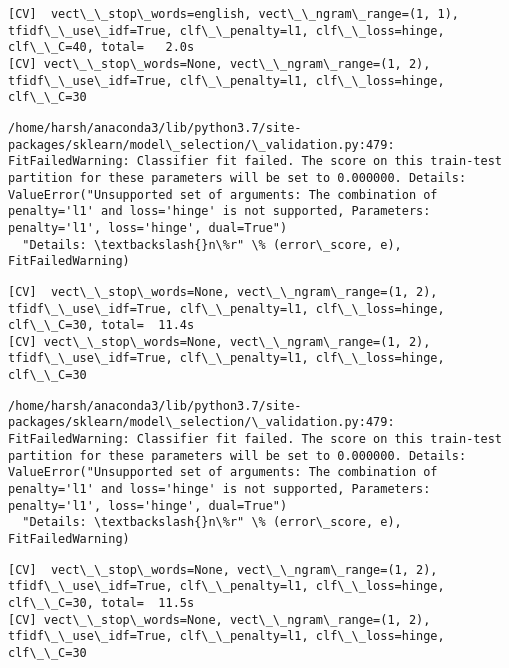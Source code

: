 \documentclass[11pt]{article}
\begin{document}
    \begin{Verbatim}[commandchars=\\\{\}]
[CV]  vect\_\_stop\_words=english, vect\_\_ngram\_range=(1, 1), tfidf\_\_use\_idf=True, clf\_\_penalty=l1, clf\_\_loss=hinge, clf\_\_C=40, total=   2.0s
[CV] vect\_\_stop\_words=None, vect\_\_ngram\_range=(1, 2), tfidf\_\_use\_idf=True, clf\_\_penalty=l1, clf\_\_loss=hinge, clf\_\_C=30 

    \end{Verbatim}

    \begin{Verbatim}[commandchars=\\\{\}]
/home/harsh/anaconda3/lib/python3.7/site-packages/sklearn/model\_selection/\_validation.py:479: FitFailedWarning: Classifier fit failed. The score on this train-test partition for these parameters will be set to 0.000000. Details: 
ValueError("Unsupported set of arguments: The combination of penalty='l1' and loss='hinge' is not supported, Parameters: penalty='l1', loss='hinge', dual=True")
  "Details: \textbackslash{}n\%r" \% (error\_score, e), FitFailedWarning)

    \end{Verbatim}

    \begin{Verbatim}[commandchars=\\\{\}]
[CV]  vect\_\_stop\_words=None, vect\_\_ngram\_range=(1, 2), tfidf\_\_use\_idf=True, clf\_\_penalty=l1, clf\_\_loss=hinge, clf\_\_C=30, total=  11.4s
[CV] vect\_\_stop\_words=None, vect\_\_ngram\_range=(1, 2), tfidf\_\_use\_idf=True, clf\_\_penalty=l1, clf\_\_loss=hinge, clf\_\_C=30 

    \end{Verbatim}

    \begin{Verbatim}[commandchars=\\\{\}]
/home/harsh/anaconda3/lib/python3.7/site-packages/sklearn/model\_selection/\_validation.py:479: FitFailedWarning: Classifier fit failed. The score on this train-test partition for these parameters will be set to 0.000000. Details: 
ValueError("Unsupported set of arguments: The combination of penalty='l1' and loss='hinge' is not supported, Parameters: penalty='l1', loss='hinge', dual=True")
  "Details: \textbackslash{}n\%r" \% (error\_score, e), FitFailedWarning)

    \end{Verbatim}

    \begin{Verbatim}[commandchars=\\\{\}]
[CV]  vect\_\_stop\_words=None, vect\_\_ngram\_range=(1, 2), tfidf\_\_use\_idf=True, clf\_\_penalty=l1, clf\_\_loss=hinge, clf\_\_C=30, total=  11.5s
[CV] vect\_\_stop\_words=None, vect\_\_ngram\_range=(1, 2), tfidf\_\_use\_idf=True, clf\_\_penalty=l1, clf\_\_loss=hinge, clf\_\_C=30 

    \end{Verbatim}
\end{document}
